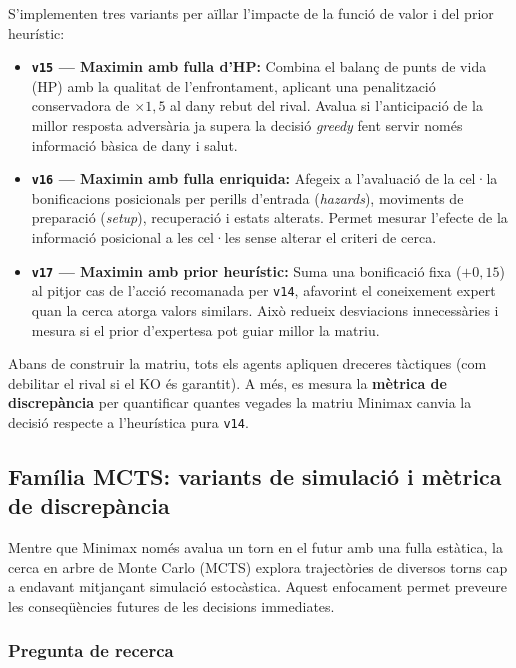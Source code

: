 S'implementen tres variants per aïllar l'impacte de la funció de valor i del prior heurístic:

\begin{itemize}
    \item \textbf{\texttt{v15} --- Maximin amb fulla d'HP:} Combina el balanç de punts de vida (HP) amb la qualitat de l'enfrontament, aplicant una penalització conservadora de $\times 1{,}5$ al dany rebut del rival. Avalua si l'anticipació de la millor resposta adversària ja supera la decisió \textit{greedy} fent servir només informació bàsica de dany i salut.
    \item \textbf{\texttt{v16} --- Maximin amb fulla enriquida:} Afegeix a l'avaluació de la cel·la bonificacions posicionals per perills d'entrada (\textit{hazards}), moviments de preparació (\textit{setup}), recuperació i estats alterats. Permet mesurar l'efecte de la informació posicional a les cel·les sense alterar el criteri de cerca.
    \item \textbf{\texttt{v17} --- Maximin amb prior heurístic:} Suma una bonificació fixa ($+0{,}15$) al pitjor cas de l'acció recomanada per \texttt{v14}, afavorint el coneixement expert quan la cerca atorga valors similars. Això redueix desviacions innecessàries i mesura si el prior d'expertesa pot guiar millor la matriu.
\end{itemize}

Abans de construir la matriu, tots els agents apliquen dreceres tàctiques (com debilitar el rival si el KO és garantit). A més, es mesura la \textbf{mètrica de discrepància} per quantificar quantes vegades la matriu Minimax canvia la decisió respecte a l'heurística pura \texttt{v14}.

\subsection{Família MCTS: variants de simulació i mètrica de discrepància}

Mentre que Minimax només avalua un torn en el futur amb una fulla estàtica, la cerca en arbre de Monte Carlo (MCTS) explora trajectòries de diversos torns cap a endavant mitjançant simulació estocàstica. Aquest enfocament permet preveure les conseqüències futures de les decisions immediates.

\subsubsection*{Pregunta de recerca}

